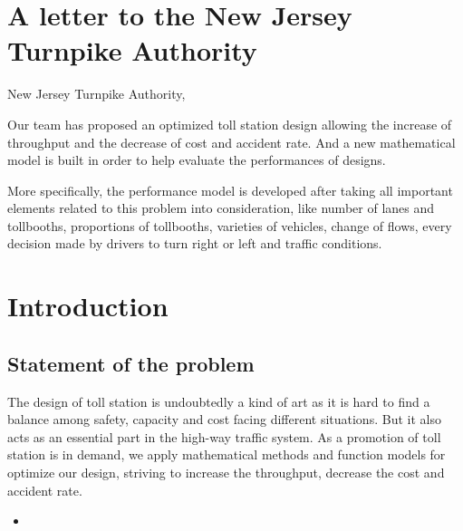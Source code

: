 \documentclass{mcmthesis}
\begin{document}
\section{A letter to the New Jersey Turnpike Authority}


New Jersey Turnpike Authority,

Our team has proposed an optimized toll station design allowing the increase of throughput and the decrease of cost and accident rate. And a new mathematical model is built in order to help evaluate the performances of designs. 

More specifically, the performance model is developed after taking all important elements related to this problem into consideration, like number of lanes and tollbooths, proportions of tollbooths, varieties of vehicles, change of flows, every decision made by drivers to turn right or left and traffic conditions. 



\section{Introduction}

\subsection{Statement of the problem}

  The design of toll station is undoubtedly a kind of art as it is hard to find a balance among safety, capacity and cost facing different situations. But it also acts as an essential part in the high-way traffic system. As a promotion of toll station is in demand, we apply mathematical methods and function models for optimize our design, striving to increase the throughput, decrease the cost and accident rate.


\begin{itemize}

\item 
\end{itemize}







\begin{Theorem} \label{thm:latex}

\end{Theorem}

\begin{Lemma} \label{thm:tex}

\end{Lemma}
\end{document}
